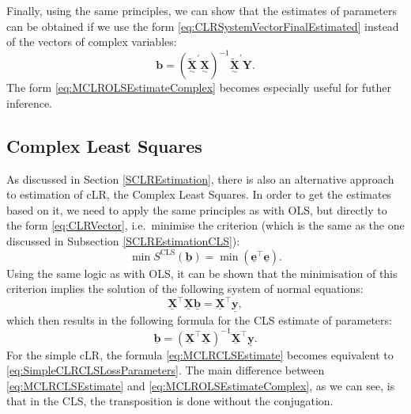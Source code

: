 \documentclass[
]{book}
\begin{document}
Finally, using the same principles, we can show that the estimates of parameters can be obtained if we use the form \eqref{eq:CLRSystemVectorFinalEstimated} instead of the vectors of complex variables:
\begin{equation}
    \boldsymbol{b} = \left( \underset{\sim}{\mathbf{\tilde{X}}}^\prime \underset{\sim}{\mathbf{X}}\right)^{-1} \underset{\sim}{\mathbf{\tilde{X}}}^\prime {\mathbf{Y}} .
    \label{eq:MCLROLSEstimateComplex}
\end{equation}
The form \eqref{eq:MCLROLSEstimateComplex} becomes especially useful for futher inference.

\hypertarget{complex-least-squares}{%
\subsection{Complex Least Squares}\label{complex-least-squares}}

As discussed in Section \ref{SCLREstimation}, there is also an alternative approach to estimation of cLR, the Complex Least Squares. In order to get the estimates based on it, we need to apply the same principles as with OLS, but directly to the form \eqref{eq:CLRVector}, i.e.~minimise the criterion (which is the same as the one discussed in Subsection \ref{SCLREstimationCLS}):
\begin{equation}
    \min S^{\mathrm{CLS}}(\underline{\boldsymbol{b}}) = \min \left(\underline{\mathbf{e}}^\top \underline{\mathbf{e}}\right).
    \label{eq:CLRCLSCriterion}
\end{equation}
Using the same logic as with OLS, it can be shown that the minimisation of this criterion implies the solution of the following system of normal equations:
\begin{equation}
    \underline{\mathbf{X}}^\top \underline{\mathbf{X}} \underline{\boldsymbol{b}} = \underline{\mathbf{X}}^\top \underline{\mathbf{y}} ,
    \label{eq:CLRCLSSystemOfNormalEquations}
\end{equation}
which then results in the following formula for the CLS estimate of parameters:
\begin{equation}
    \underline{\boldsymbol{b}} = \left( \underline{\mathbf{X}}^\top \underline{\mathbf{X}}\right)^{-1} \underline{\mathbf{X}}^\top \underline{\mathbf{y}} .
    \label{eq:MCLRCLSEstimate}
\end{equation}
For the simple cLR, the formula \eqref{eq:MCLRCLSEstimate} becomes equivalent to \eqref{eq:SimpleCLRCLSLossParameters}. The main difference between \eqref{eq:MCLRCLSEstimate} and \eqref{eq:MCLROLSEstimateComplex}, as we can see, is that in the CLS, the transposition is done without the conjugation.
\end{document}
